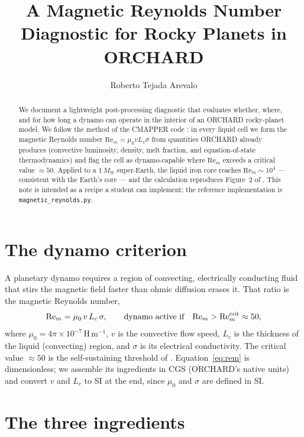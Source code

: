 \documentclass{aastex631}
\newcommand{\code}[1]{\texttt{#1}}
\newcommand{\Rem}{\mathrm{Re}_m}
\newcommand{\Lc}{L_c}
\newcommand{\Mearth}{M_\oplus}
\begin{document}
\title{A Magnetic Reynolds Number Diagnostic for Rocky Planets in ORCHARD}

\author{Roberto Tejada Arevalo}

\begin{abstract}
We document a lightweight post-processing diagnostic that evaluates whether, where,
and for how long a dynamo can operate in the interior of an ORCHARD rocky-planet
model.  We follow the method of the CMAPPER code \citep[][Section~3.3]{Zhang2025}:
in every liquid cell we form the magnetic Reynolds number $\Rem=\mu_0 v \Lc \sigma$
from quantities ORCHARD already produces (convective luminosity, density, melt
fraction, and equation-of-state thermodynamics) and flag the cell as dynamo-capable
where $\Rem$ exceeds a critical value $\approx50$.  Applied to a $1\,\Mearth$
super-Earth, the liquid iron core reaches $\Rem\sim10^4$ --- consistent with the
Earth's core --- and the calculation reproduces Figure~2 of \citet{Zhang2025}.  This
note is intended as a recipe a student can implement; the reference implementation is
\code{magnetic\_reynolds.py}.
\end{abstract}

\section{The dynamo criterion}

A planetary dynamo requires a region of convecting, electrically conducting fluid that
stirs the magnetic field faster than ohmic diffusion erases it.  That ratio is the
magnetic Reynolds number,
\begin{equation}
  \Rem = \mu_0\, v\, \Lc\, \sigma ,
  \qquad\text{dynamo active if}\quad \Rem > \Rem^{\rm crit}\approx 50 ,
  \label{eq:rem}
\end{equation}
where $\mu_0=4\pi\times10^{-7}\,\mathrm{H\,m^{-1}}$, $v$ is the convective flow speed,
$\Lc$ is the thickness of the liquid (convecting) region, and $\sigma$ is its electrical
conductivity.  The critical value $\approx 50$ is the self-sustaining threshold of
\citet{ChristensenAubert2006}.  Equation~\eqref{eq:rem} is dimensionless; we assemble
its ingredients in CGS (ORCHARD's native units) and convert $v$ and $\Lc$ to SI at the
end, since $\mu_0$ and $\sigma$ are defined in SI.

\section{The three ingredients}
\end{document}
